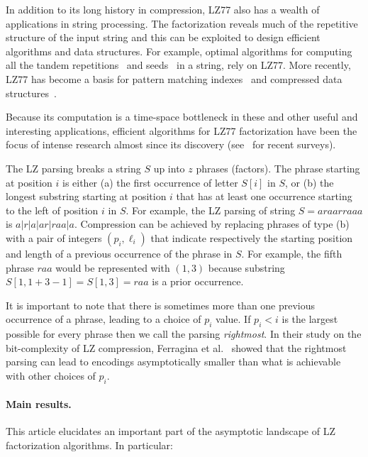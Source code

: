 \documentclass[11pt,runningheads]{llncs}
\begin{document}
In addition to its long history in compression,
LZ77 also has a wealth of applications in string processing. The factorization
reveals much of the repetitive structure of the input string and this can be exploited
to design efficient algorithms and data structures. For example, optimal algorithms
for computing all the tandem repetitions~\cite{kk1999} and seeds~\cite{kkrrw2012} 
in a string, rely on LZ77.
More recently, LZ77 has become a basis for pattern matching
indexes~\cite{ggknp2014,kn2012}
and compressed data structures~\cite{bggkopt2015}.

Because its computation is a time-space bottleneck in these and other useful and 
interesting applications, efficient algorithms for LZ77 factorization have been 
the focus of intense research almost since its discovery (see~\cite{aciksty2012,kkp2013-sea} for recent surveys).

\smallskip

The LZ parsing breaks a string $S$ up into $z$ phrases (factors). The phrase
starting at position $i$ is either (a) the first occurrence of letter $S[i]$ in 
$S$, or (b) the longest substring starting at position $i$ that has at least one 
occurrence starting to the left of position $i$ in $S$. For example, the LZ 
parsing of string $S = araarraaa$ is $a|r|a|ar|raa|a$. Compression can be achieved by 
replacing phrases of type (b) with a pair of integers $(p_i,\ell_i)$ that indicate respectively the 
starting position and length of a previous occurrence of the phrase in $S$. For example, the 
fifth phrase $raa$ would be represented with $(1,3)$ because substring $S[1,1+3-1] = S[1,3] = raa$
is a prior occurrence.

It is important to note that there is sometimes more than one previous occurrence of a phrase, 
leading to a choice of $p_i$ value. If 
$p_i < i$
is the largest possible for every phrase then we call the parsing {\em rightmost}. 
In their study on the bit-complexity of LZ compression, Ferragina et al.~\cite{fnv2013} 
showed that the rightmost parsing can lead to encodings asymptotically smaller than
what is achievable with other choices of $p_i$.

\paragraph{Main results.}

This article elucidates an important part of the asymptotic landscape of LZ
factorization algorithms. In particular:
\end{document}
